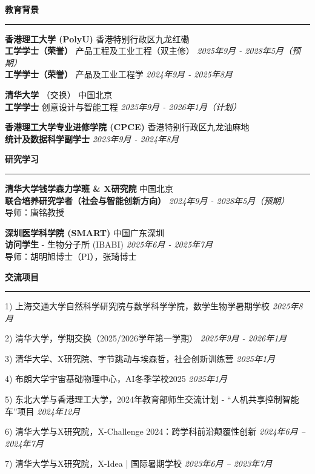 \documentclass[UTF8, 10pt, fontset=adobe]{ctexart}
\renewenvironment{rSection}[1]{
\sectionskip
\textcolor{TsinghuaPurple}{\textbf{#1}}
\sectionlineskip
\hrule
\begin{list}{}{
\setlength{\leftmargin}{0em}
}
\item[]
}{
\end{list}
}
\begin{document}
  


\begin{rSection}{教育背景}
{\textbf{香港理工大学 (PolyU)}} \hfill {香港特别行政区九龙红磡}\\
{\textbf{工学学士（荣誉）} 产品工程及工业工程（双主修）} \hfill \textit{2025年9月 - 2028年5月（预期）}\\
{\textbf{工学学士（荣誉）} 产品及工业工程学} \hfill \textit{2024年9月 - 2025年8月}

{\textbf{清华大学}} （交换） \hfill {中国北京}\\
{\textbf {工学学士} 创意设计与智能工程} \hfill \textit{2025年9月 - 2026年1月（计划）}

{\textbf{香港理工大学专业进修学院 (CPCE)}} \hfill {香港特别行政区九龙油麻地}\\
{\textbf{统计及数据科学副学士}} \hfill \textit{2023年9月 - 2024年8月}
\end{rSection}

\begin{rSection}{研究学习}
{\textbf{清华大学钱学森力学班 \& X研究院}} \hfill {中国北京}\\
{\textbf{联合培养研究学者（社会与智能创新方向）}} \hfill \textit{2024年9月 - 2028年5月（预期）}\\
{导师：唐铭教授}

{\textbf{深圳医学科学院 (SMART)}} \hfill {中国广东深圳}\\
{\textbf{访问学生} - 生物分子所 (IBABI)} \hfill \textit{2025年6月 - 2025年7月}\\
{导师：胡明旭博士（PI），张琦博士}
\end{rSection}

\begin{rSection}{交流项目}
1) 上海交通大学自然科学研究院与数学科学学院，数学生物学暑期学校 \hfill \textit{2025年8月}

2)	清华大学，学期交换（2025/2026学年第一学期）	\hfill \textit{2025年9月 - 2026年1月}

3)	清华大学、X研究院、字节跳动与埃森哲，社会创新训练营	 \hfill \textit{2025年1月}

4)	布朗大学宇宙基础物理中心，AI冬季学校2025	 \hfill \textit{2025年1月}

5)	东北大学与香港理工大学，2024年教育部师生交流计划 - “人机共享控制智能车”项目 \hfill \textit{2024年12月}

6)	清华大学与X研究院，X-Challenge 2024：跨学科前沿颠覆性创新 \hfill \textit{2024年6月 -- 2024年7月}

7)	清华大学与X研究院，X-Idea | 国际暑期学校 \hfill \textit{2023年6月 -- 2023年7月}
\end{rSection}
\end{document}
